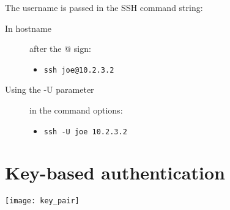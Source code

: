 \documentclass[slides]{pgnotes}
\begin{document}
The username is passed in the SSH command string:

\begin{description}
\item[In hostname] after the @ sign:
  \begin{itemize}
  \item \texttt{ssh joe@10.2.3.2}
  \end{itemize}
\item[Using the -U parameter] in the command options:
  \begin{itemize}
  \item \texttt{ssh -U joe 10.2.3.2}
  \end{itemize}
\end{description}


\section{Key-based authentication}

\begin{center}
  \texttt{[image: key\_pair]}
\end{center}
  
\end{document}
